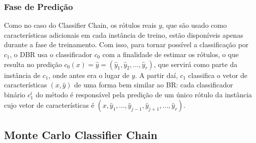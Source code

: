   \subsubsection{Fase de Predição}
  Como no caso do Classifier Chain, os rótulos reais $y$, que são usado como características adicionais em cada instância de treino,
 estão disponíveis apenas durante a fase de treinamento.
 Com isso, para tornar possível a classificação por $c_1$, o DBR usa o classificador $c_0$ com a finalidade de
 estimar os rótulos, %
 o que resulta no predição $c_0(x)=\hat{y}=(\hat{y}_1,\hat{y}_2,...,\hat{y}_r)$, que servirá como parte da instância de $c_1$,
 onde antes era o lugar de $y$. 
 A partir daí, $c_1$ classifica o vetor de características $(x,\hat{y})$ de uma forma bem similar ao BR:
 cada classificador binário $c_1^i$ do método é responsável pela predição de um único rótulo da instância
 cujo vetor de características é $(x,\hat{y}_1,...,\hat{y}_{j-1},\hat{y}_{j+1},...,\hat{y}_r)$.

\subsection{Monte Carlo Classifier Chain}
\cite{mcc2012}



